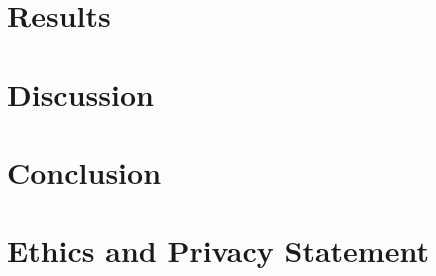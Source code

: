 \documentclass[manuscript,screen,review]{acmart}
\begin{document}
\section{Results}
\label{sec:results}

\section{Discussion}
\label{sec:discussion}

\section{Conclusion}
\label{sec:conclusion}

\begin{acks}

\end{acks}

\section*{Ethics and Privacy Statement}




\appendix

\section{}
\label{app:1}
\end{document}
